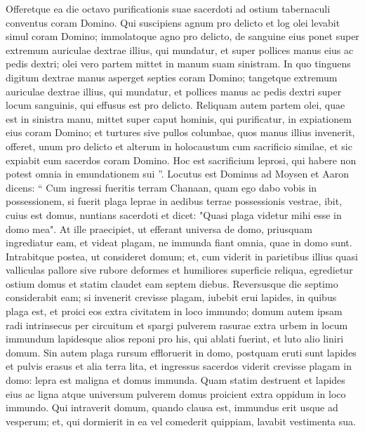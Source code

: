 \begin{biblechapter}
\begin{biblechapter}
\begin{biblechapter}
\begin{biblechapter}
\begin{biblechapter}
\begin{biblechapter}
\begin{biblechapter}
\begin{biblechapter}
\begin{biblechapter}
\begin{biblechapter}
\begin{biblechapter}
\begin{biblechapter}
\begin{biblechapter}
\begin{biblechapter}
\verse Offeretque ea die octavo purificationis suae sacerdoti ad ostium tabernaculi conventus coram Domino. 
 \verse Qui suscipiens agnum pro delicto et log olei levabit simul coram Domino; 
 \verse immolatoque agno pro delicto, de sanguine eius ponet super extremum auriculae dextrae illius, qui mundatur, et super pollices manus eius ac pedis dextri; 
 \verse olei vero partem mittet in manum suam sinistram. 
\verse In quo tinguens digitum dextrae manus asperget septies coram Domino; 
\verse tangetque extremum auriculae dextrae illius, qui mundatur, et pollices manus ac pedis dextri super locum sanguinis, qui effusus est pro delicto. 
\verse Reliquam autem partem olei, quae est in sinistra manu, mittet super caput hominis, qui purificatur, in expiationem eius coram Domino; 
\verse et turtures sive pullos columbae, quos manus illius invenerit, offeret, 
\verse unum pro delicto et alterum in holocaustum cum sacrificio similae, et sic expiabit eum sacerdos coram Domino.
 \verse Hoc est sacrificium leprosi, qui habere non potest omnia in emundationem sui ”.
 \verse Locutus est Dominus ad Moysen et Aaron dicens: 
\verse “ Cum ingressi fueritis terram Chanaan, quam ego dabo vobis in possessionem, si fuerit plaga leprae in aedibus terrae possessionis vestrae, 
\verse ibit, cuius est domus, nuntians sacerdoti et dicet: "Quasi plaga videtur mihi esse in domo mea". 
\verse At ille praecipiet, ut efferant universa de domo, priusquam ingrediatur eam, et videat plagam, ne immunda fiant omnia, quae in domo sunt. Intrabitque postea, ut consideret domum; 
\verse et, cum viderit in parietibus illius quasi valliculas pallore sive rubore deformes et humiliores superficie reliqua, 
\verse egredietur ostium domus et statim claudet eam septem diebus. 
\verse Reversusque die septimo considerabit eam; si invenerit crevisse plagam, 
\verse iubebit erui lapides, in quibus plaga est, et proici eos extra civitatem in loco immundo; 
\verse domum autem ipsam radi intrinsecus per circuitum et spargi pulverem rasurae extra urbem in locum immundum 
\verse lapidesque alios reponi pro his, qui ablati fuerint, et luto alio liniri domum.
 \verse Sin autem plaga rursum effloruerit in domo, postquam eruti sunt lapides et pulvis erasus et alia terra lita, 
\verse et ingressus sacerdos viderit crevisse plagam in domo: lepra est maligna et domus immunda. 
\verse Quam statim destruent et lapides eius ac ligna atque universum pulverem domus proicient extra oppidum in loco immundo. 
\verse Qui intraverit domum, quando clausa est, immundus erit usque ad vesperum; 
\verse et, qui dormierit in ea vel comederit quippiam, lavabit vestimenta sua.

\end{biblechapter}
\end{biblechapter}
\end{biblechapter}
\end{biblechapter}
\end{biblechapter}
\end{biblechapter}
\end{biblechapter}
\end{biblechapter}
\end{biblechapter}
\end{biblechapter}
\end{biblechapter}
\end{biblechapter}
\end{biblechapter}
\end{biblechapter}
